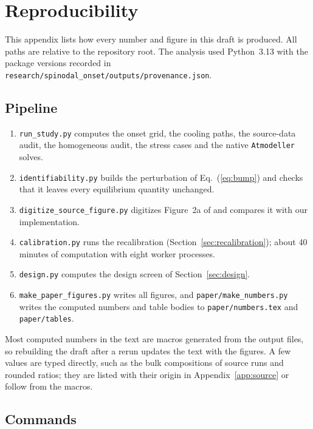 \chapter{Reproducibility}\label{app:repro}

This appendix lists how every number and figure in this draft is produced. All paths are
relative to the repository root. The analysis used Python~3.13 with the package versions
recorded in \texttt{research/spinodal\_onset/outputs/provenance.json}.

\section{Pipeline}

\begin{enumerate}
\item \texttt{run\_study.py} computes the onset grid, the cooling paths, the source-data audit,
the homogeneous audit, the stress cases and the native \texttt{Atmodeller} solves.
\item \texttt{identifiability.py} builds the perturbation of Eq.~(\ref{eq:bump}) and checks that
it leaves every equilibrium quantity unchanged.
\item \texttt{digitize\_source\_figure.py} digitizes Figure~2a of \cite{gilmore2026} and compares
it with our implementation.
\item \texttt{calibration.py} runs the recalibration (Section~\ref{sec:recalibration}); about
40 minutes of computation with eight worker processes.
\item \texttt{design.py} computes the design screen of Section~\ref{sec:design}.
\item \texttt{make\_paper\_figures.py} writes all figures, and \texttt{paper/make\_numbers.py}
writes the computed numbers and table bodies to \texttt{paper/numbers.tex} and
\texttt{paper/tables}.
\end{enumerate}

Most computed numbers in the text are macros generated from the output files, so rebuilding
the draft after a rerun updates the text with the figures. A few values are typed directly,
such as the bulk compositions of source runs and rounded ratios; they are listed with their
origin in Appendix~\ref{app:source} or follow from the macros.

\section{Commands}

